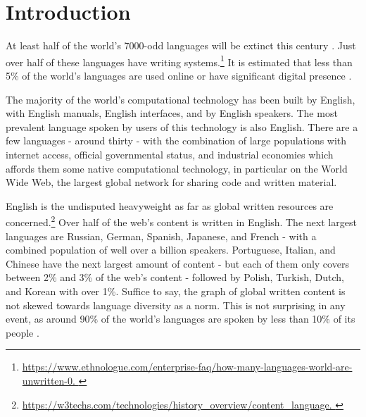 \section{Introduction}
\label{sec:intro}

At least half of the world's 7000-odd languages will be extinct this century \citep{krauss92, grenoble2011cambridge}. Just over half of these languages have writing systems.\footnote{\href{https://www.ethnologue.com/enterprise-faq/how-many-languages-world-are-unwritten-0. Last accessed May~1, 2015.}{https://www.ethnologue.com/enterprise-faq/how-many-languages-world-are-unwritten-0. }} It is estimated that less than 5\% of the world's languages are used online or have significant digital presence \citep{kornai2013digital}.

The majority of the world's computational technology has been built by English, with English manuals, English interfaces, and by English speakers. The most prevalent language spoken by users of this technology is also English. There are a few languages - around thirty - with the combination of large populations with internet access, official governmental status, and industrial economies which affords them some native computational technology, in particular on the World Wide Web, the largest global network for sharing code and written material.

English is the undisputed heavyweight as far as global written resources are concerned.\footnote{\href{https://w3techs.com/technologies/history\_overview/content\_language}{https://w3techs.com/technologies/history\_overview/content\_language. }} Over half of the web's content is written in English. The next largest languages are Russian, German, Spanish, Japanese, and French - with a combined population of well over a billion speakers. Portuguese, Italian, and Chinese have the next largest amount of content - but each of them only covers between 2\% and 3\% of the web's content - followed by Polish, Turkish, Dutch, and Korean with over 1\%. Suffice to say, the graph of global written content is not skewed towards language diversity as a norm. This is not surprising in any event, as around 90\% of the world's languages are spoken by less than 10\% of its people \citep{bernard1992preserving}.

